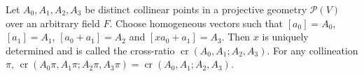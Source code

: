Let $A_0, A_1, A_2, A_3$ be distinct collinear points in a projective geometry $\mathcal{P}(V)$ over an arbitrary field $F$. Choose homogeneous vectors such that $[a_0] = A_0$, $[a_1] = A_1$, $[a_0 + a_1] = A_2$ and $[x a_0 + a_1] = A_3$. Then $x$ is uniquely determined and is called the cross-ratio $\operatorname{cr}(A_0, A_1; A_2, A_3)$. For any collineation $\pi$, $\operatorname{cr}(A_0\pi, A_1\pi; A_2\pi, A_3\pi) = \operatorname{cr}(A_0, A_1; A_2, A_3)$.
